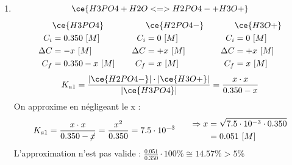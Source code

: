 \documentclass[
  11pt,
  a4paper,
  openany]{book}
\providecommand{\tightlist}{%
  \setlength{\itemsep}{0pt}\setlength{\parskip}{0pt}}
\begin{document}
\begin{Answer}

\begin{enumerate}
\def\labelenumi{\alph{enumi}.}
\tightlist
\item
  \[
  \ce{H3PO4 + H2O <=> H2PO4- + H3O+}
  \]
  \[
  \begin{split}
  &\ce{H3PO4}\\
  C_i &= 0.350\ [M] \\
  \Delta C &= - x\ [M] \\
  C_f &= 0.350 - x\ [M] \\
  \end{split}
  \qquad
  \begin{split}
  &\ce{H2PO4-}\\
  C_i &= 0\ [M] \\
  \Delta C &= + x\ [M] \\
  C_f &= x\ [M] \\
  \end{split}
  \qquad
  \begin{split}
  &\ce{H3O+}\\
  C_i &= 0\ [M] \\
  \Delta C &= + x\ [M] \\
  C_f &= x\ [M] \\
  \end{split}
  \]
  \[
  K_{a1} = \frac{|\ce{H2PO4-}| \cdot |\ce{H3O+}|}{|\ce{H3PO4}|} = \frac{x \cdot x}{0.350 - x}
  \]
  On approxime en négligeant le x :
  \[
  \begin{split}
  K_{a1} = \frac{x \cdot x}{0.350 - \cancel{x}} = \frac{x^2}{0.350} = 7.5 \cdot 10^{-3}
  \end{split}
  \qquad
  \begin{split}
  \Rightarrow x &= \sqrt{7.5 \cdot 10^{-3} \cdot 0.350} \\
    &= 0.051\ [M]
  \end{split}
  \]
  L'approximation n'est pas valide : \(\frac{0.051}{0.350} \cdot 100\% \cong 14.57\% > 5\%\)
\end{enumerate}


\end{Answer}
\end{document}
